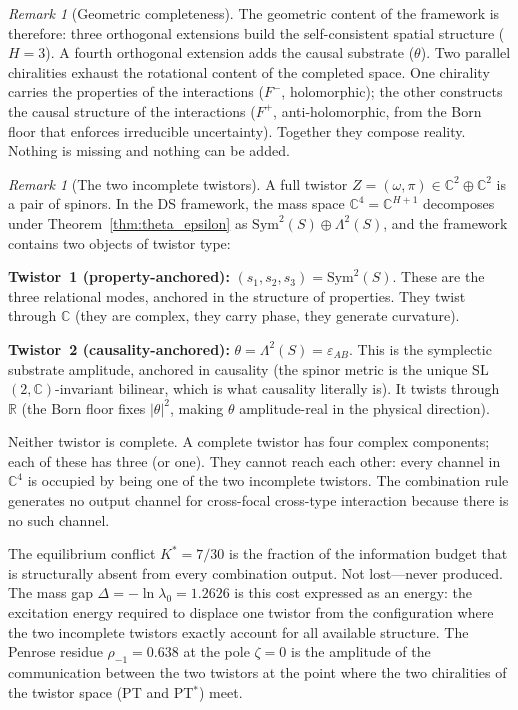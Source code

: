 \documentclass[11pt,a4paper]{article}
\theoremstyle{definition}
\theoremstyle{remark}
\newtheorem{remark}[theorem]{Remark}
\newcommand{\C}{\mathbb{C}}
\newcommand{\R}{\mathbb{R}}
\begin{document}
\begin{remark}[Geometric completeness]
The geometric content of the framework is therefore: three orthogonal extensions build the self-consistent spatial structure ($H=3$). A fourth orthogonal extension adds the causal substrate ($\theta$). Two parallel chiralities exhaust the rotational content of the completed space. One chirality carries the properties of the interactions ($F^-$, holomorphic); the other constructs the causal structure of the interactions ($F^+$, anti-holomorphic, from the Born floor that enforces irreducible uncertainty). Together they compose reality. Nothing is missing and nothing can be added.
\end{remark}

\begin{remark}[The two incomplete twistors]\label{rem:two_twistors}
A full twistor $Z=(\omega,\pi)\in\C^2\oplus\C^2$ is a pair of spinors. In the DS framework, the mass space $\C^4=\C^{H+1}$ decomposes under Theorem~\ref{thm:theta_epsilon} as $\mathrm{Sym}^2(S)\oplus\Lambda^2(S)$, and the framework contains two objects of twistor type:

\textbf{Twistor~1 (property-anchored):} $(s_1,s_2,s_3)=\mathrm{Sym}^2(S)$. These are the three relational modes, anchored in the structure of properties. They twist through $\C$ (they are complex, they carry phase, they generate curvature).

\textbf{Twistor~2 (causality-anchored):} $\theta=\Lambda^2(S)=\varepsilon_{AB}$. This is the symplectic substrate amplitude, anchored in causality (the spinor metric is the unique SL$(2,\C)$-invariant bilinear, which is what causality literally is). It twists through $\R$ (the Born floor fixes $|\theta|^2$, making $\theta$ amplitude-real in the physical direction).

Neither twistor is complete. A complete twistor has four complex components; each of these has three (or one). They cannot reach each other: every channel in $\C^4$ is occupied by being one of the two incomplete twistors. The combination rule generates no output channel for cross-focal cross-type interaction because there is no such channel.

The equilibrium conflict $K^*=7/30$ is the fraction of the information budget that is structurally absent from every combination output. Not lost---never produced. The mass gap $\Delta=-\ln\lambda_0=1.2626$ is this cost expressed as an energy: the excitation energy required to displace one twistor from the configuration where the two incomplete twistors exactly account for all available structure. The Penrose residue $\rho_{-1}=0.638$ at the pole $\zeta=0$ is the amplitude of the communication between the two twistors at the point where the two chiralities of the twistor space (PT and PT$^*$) meet.


\end{remark}
\end{document}
